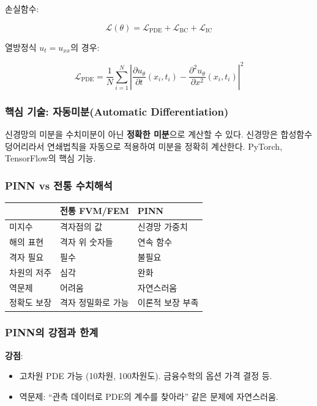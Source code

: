 \documentclass[11pt,a4paper]{article}
\begin{document}
손실함수:

\begin{equation}
\mathcal{L}(\theta) = \mathcal{L}_{\text{PDE}} + \mathcal{L}_{\text{BC}} + \mathcal{L}_{\text{IC}}
\end{equation}

열방정식 $u_t = u_{xx}$의 경우:

\begin{equation}
\mathcal{L}_{\text{PDE}} = \frac{1}{N}\sum_{i=1}^N \left|\frac{\partial u_\theta}{\partial t}(x_i, t_i) - \frac{\partial^2 u_\theta}{\partial x^2}(x_i, t_i)\right|^2
\end{equation}

\subsubsection{핵심 기술: 자동미분(Automatic Differentiation)}

신경망의 미분을 수치미분이 아닌 \textbf{정확한 미분}으로 계산할 수 있다. 신경망은 합성함수 덩어리라서 연쇄법칙을 자동으로 적용하여 미분을 정확히 계산한다. PyTorch, TensorFlow의 핵심 기능.

\subsubsection{PINN vs 전통 수치해석}

\begin{center}
\begin{tabular}{lll}
\toprule
& 전통 FVM/FEM & PINN \\
\midrule
미지수 & 격자점의 값 & 신경망 가중치 \\
해의 표현 & 격자 위 숫자들 & 연속 함수 \\
격자 필요 & 필수 & 불필요 \\
차원의 저주 & 심각 & 완화 \\
역문제 & 어려움 & 자연스러움 \\
정확도 보장 & 격자 정밀화로 가능 & 이론적 보장 부족 \\
\bottomrule
\end{tabular}
\end{center}

\subsubsection{PINN의 강점과 한계}

\textbf{강점}:
\begin{itemize}
\item 고차원 PDE 가능 (10차원, 100차원도). 금융수학의 옵션 가격 결정 등.
\item 역문제: ``관측 데이터로 PDE의 계수를 찾아라'' 같은 문제에 자연스러움.
\end{itemize}
\end{document}
